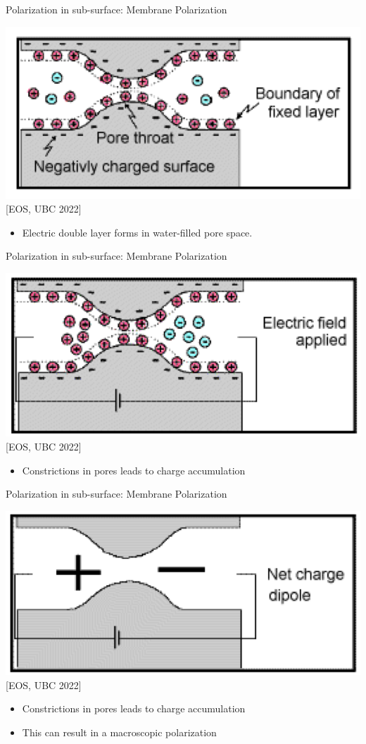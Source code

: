 \begin{frame}
  \begin{PointSix}{Polarization in sub-surface: Membrane Polarization}

    \includegraphics[width=0.5\linewidth]{Figures/InducedPolarization/MembranePotential1_GPG.png}
    \tiny [EOS, UBC 2022]
    \small
    \begin{itemize}
      \item Electric double layer forms in water-filled pore space.
    \end{itemize}  
  \end{PointSix}
\end{frame}

\begin{frame}
  \begin{PointSix}{Polarization in sub-surface: Membrane Polarization}

    \includegraphics[width=0.5\linewidth]{Figures/InducedPolarization/MembranePotential2_EOS_UBC.png}
    \tiny [EOS, UBC 2022]

    \small
    \begin{itemize}
      \item Constrictions in pores leads to charge accumulation
    \end{itemize}  
  \end{PointSix}
\end{frame}

\begin{frame}
  \begin{PointSix}{Polarization in sub-surface: Membrane Polarization}

    \includegraphics[width=0.5\linewidth]{Figures/InducedPolarization/MembranePotential3_EOS_UBC.png}
    \tiny [EOS, UBC 2022]

    \small
    \begin{itemize}
      \item Constrictions in pores leads to charge accumulation
      \item This can result in a macroscopic polarization
    \end{itemize}  
  \end{PointSix}
\end{frame}

